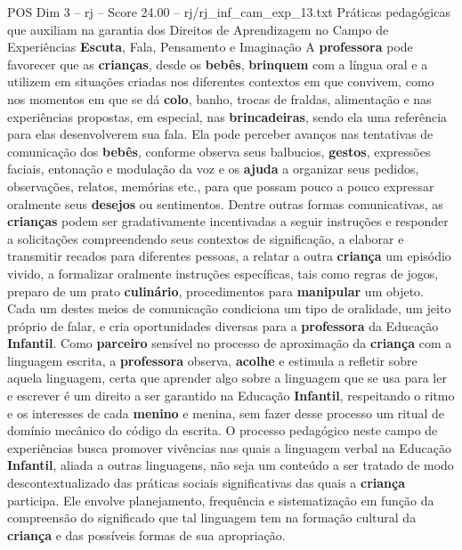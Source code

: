 \begin{textsample}{POS Dim 3 – rj – Score 24.00 – rj/rj\_inf\_cam\_exp\_13.txt}  \label{ex:f3_pos_007}
Práticas pedagógicas que auxiliam na garantia dos Direitos de Aprendizagem no Campo de Experiências \textbf{Escuta}, Fala, Pensamento e Imaginação A \textbf{professora} pode favorecer que as \textbf{crianças}, desde os \textbf{bebês}, \textbf{brinquem} com a língua oral e a utilizem em situações criadas nos diferentes contextos em que convivem, como nos momentos em que se dá \textbf{colo}, banho, trocas de fraldas, alimentação e nas experiências propostas, em especial, nas \textbf{brincadeiras}, sendo ela uma referência para elas desenvolverem sua fala.
Ela pode perceber avanços nas tentativas de comunicação dos \textbf{bebês}, conforme observa seus balbucios, \textbf{gestos}, expressões faciais, entonação e modulação da voz e os \textbf{ajuda} a organizar seus pedidos, observações, relatos, memórias etc., para que possam pouco a pouco expressar oralmente seus \textbf{desejos} ou sentimentos.
Dentre outras formas comunicativas, as \textbf{crianças} podem ser gradativamente incentivadas a seguir instruções e responder a solicitações compreendendo seus contextos de significação, a elaborar e transmitir recados para diferentes pessoas, a relatar a outra \textbf{criança} um episódio vivido, a formalizar oralmente instruções específicas, tais como regras de jogos, preparo de um prato \textbf{culinário}, procedimentos para \textbf{manipular} um objeto.
Cada um destes meios de comunicação condiciona um tipo de oralidade, um jeito próprio de falar, e cria oportunidades diversas para a \textbf{professora} da Educação \textbf{Infantil}.
Como \textbf{parceiro} sensível no processo de aproximação da \textbf{criança} com a linguagem escrita, a \textbf{professora} observa, \textbf{acolhe} e estimula a refletir sobre aquela linguagem, certa que aprender algo sobre a linguagem que se usa para ler e escrever é um direito a ser garantido na Educação \textbf{Infantil}, respeitando o ritmo e os interesses de cada \textbf{menino} e menina, sem fazer desse processo um ritual de domínio mecânico do código da escrita.
O processo pedagógico neste campo de experiências busca promover vivências nas quais a linguagem verbal na Educação \textbf{Infantil}, aliada a outras linguagens, não seja um conteúdo a ser tratado de modo descontextualizado das práticas sociais significativas das quais a \textbf{criança} participa.
Ele envolve planejamento, frequência e sistematização em função da compreensão do significado que tal linguagem tem na formação cultural da \textbf{criança} e das possíveis formas de sua apropriação.

\end{textsample}
